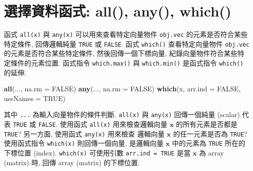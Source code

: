 \documentclass[
]{book}
\newenvironment{Shaded}{\begin{snugshade}}{\end{snugshade}}
\newcommand{\DataTypeTok}[1]{\textcolor[rgb]{0.13,0.29,0.53}{#1}}
\newcommand{\KeywordTok}[1]{\textcolor[rgb]{0.13,0.29,0.53}{\textbf{#1}}}
\newcommand{\NormalTok}[1]{#1}
\newcommand{\OtherTok}[1]{\textcolor[rgb]{0.56,0.35,0.01}{#1}}
\begin{document}
\hypertarget{ux9078ux64c7ux8cc7ux6599ux51fdux5f0f-all-any-which}{%
\section{選擇資料函式: all(), any(), which()}\label{ux9078ux64c7ux8cc7ux6599ux51fdux5f0f-all-any-which}}

函式
\texttt{all(x)} 與
\texttt{any(x)}
可以用來查看特定向量物件 \texttt{obj.vec} 的元素是否符合某些特定條件,
回傳邏輯純量 \texttt{TRUE} 或 \texttt{FALSE}.
函式
\texttt{which()}
查看特定向量物件 \texttt{obj.vec} 的元素是否符合某些特定條件,
然後回傳一個下標向量, 紀錄向量物件符合某些特定條件的元素位置.
函式指令
\texttt{which.max()}
與
\texttt{which.min()}
是函式指令
\texttt{which()}
的延伸.

\begin{Shaded}
\begin{Highlighting}[]
\KeywordTok{all}\NormalTok{(..., }\DataTypeTok{na.rm =} \OtherTok{FALSE}\NormalTok{)}
\KeywordTok{any}\NormalTok{(..., }\DataTypeTok{na.rm =} \OtherTok{FALSE}\NormalTok{)}
\KeywordTok{which}\NormalTok{(x, }\DataTypeTok{arr.ind =} \OtherTok{FALSE}\NormalTok{, }\DataTypeTok{useNames =} \OtherTok{TRUE}\NormalTok{)}
\end{Highlighting}
\end{Shaded}

其中 \texttt{...} 為輸入向量物件的條件判斷.
\texttt{all(x)}
與
\texttt{any(x)}
回傳一個純量 (scalar) 代表 \texttt{TRUE} 或 \texttt{FALSE}.
使用函式
\texttt{all(x)}
用來檢查邏輯向量 \(\mathbf{x}\) 的所有元素是否都是 \texttt{TRUE}?
另一方面,
使用函式
\texttt{any(x)}
用來檢查 邏輯向量 \(\mathbf{x}\) 的任一元素是否為 \texttt{TRUE}?
使用函式指令
\texttt{which(x)}
則回傳一個向量,
是邏輯向量 \(\mathbf{x}\) 中的元素為 \texttt{TRUE} 所在的下標位置 (index).
\texttt{which(x)} 可使用引數 \texttt{arr.ind\ =\ TRUE} 是當 \(\mathbf{x}\) 為 array (matrix) 時,
回傳 array (matrix) 的下標位置.
\end{document}
